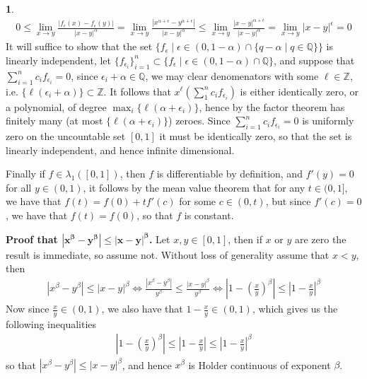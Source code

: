 \documentclass[10.5pt]{article}
\theoremstyle{definition}
\newtheorem{pb}{}
\newcommand{\set}[1]{\{#1\}}
\newcommand{\abs}[1]{\left\vert#1\right\vert}
\newcommand{\tor}{\text{ or }}
\begin{document}
\begin{pb}
            \begin{align*}
                0 \leq \lim_{x \to y}\frac{\abs{f_\epsilon(x) - f_\epsilon(y)}}{\abs{x-y}^\alpha} = \lim_{x \to y}\frac{\abs{x^{\alpha + \epsilon} - y^{\alpha + \epsilon}}}{\abs{x-y}^\alpha} \leq \lim_{x \to y}\frac{\abs{x - y}^{\alpha + \epsilon}}{\abs{x-y}^\alpha} = \lim_{x \to y}\abs{x-y}^\epsilon = 0
            \end{align*}
            It will suffice to show that the set \(\set{f_\epsilon \mid \epsilon \in (0,1-\alpha) \cap \set{q - \alpha \mid q \in \mathbb{Q}}}\) is linearly independent, let \(\set{f_{\epsilon_i}}_{i=1}^n \subset \set{f_\epsilon \mid \epsilon \in (0,1-\alpha) \cap \mathbb{Q}}\), and suppose that \(\sum_{i=1}^n c_i f_{\epsilon_i} = 0\), since \(\epsilon_i + \alpha \in \mathbb{Q}\), we may clear denomenators with some \(\ell \in \mathbb{Z}\), i.e. \(\set{\ell(\epsilon_i + \alpha)} \subset \mathbb{Z}\). It follows that \(x^\ell(\sum_1^n c_i f_{\epsilon_i})\) is either identically zero, or a polynomial, of degree \(\max_i\set{\ell (\alpha + \epsilon_i)}\), hence by the factor theorem has finitely many (at most \(\set{\ell (\alpha + \epsilon_i)}\)) zeroes. Since \(\sum_{i=1}^n c_i f_{\epsilon_i} = 0\) is uniformly zero on the uncountable set \([0,1]\) it must be identically zero, so that the set is linearly independent, and hence infinite dimensional.

            Finally if \(f \in \lambda_1([0,1])\), then \(f\) is differentiable by definition, and \(f'(y) = 0\) for all \(y \in (0,1)\), it follows by the mean value theorem that for any \(t \in (0,1]\), we have that \(f(t) = f(0) + tf'(c)\) for some \(c \in (0,t)\), but since \(f'(c) = 0\), we have that \(f(t) = f(0)\), so that \(f\) is constant.

            \textbf{Proof that \(\mathbf{\abs{x^\beta - y^\beta} \leq \abs{x-y}^\beta}\).} Let \(x,y \in [0,1]\), then if \(x \tor y\) are zero the result is immediate, so assume not. Without loss of generality assume that \(x < y\), then
            \begin{align*}
                \abs{x^\beta - y^\beta} \leq \abs{x - y}^\beta \iff \frac{\abs{x^\beta - y^\beta}}{y^\beta} \leq \frac{\abs{x - y}^\beta}{y^\beta} \iff \abs{1 - \left(\frac{x}{y}\right)^\beta} \leq \abs{1 - \frac{x}{y}}^\beta
            \end{align*}
            Now since \(\frac{x}{y} \in (0,1)\), we also have that \(1 - \frac{x}{y} \in (0,1)\), which gives us the following inequalities
            \begin{align*}
                \abs{1 - \left(\frac{x}{y}\right)^\beta} \leq \abs{1 - \frac{x}{y}} \leq \abs{1 - \frac{x}{y}}^\beta
            \end{align*}
            so that \(\abs{x^\beta - y^\beta} \leq \abs{x - y}^\beta\), and hence \(x^\beta\) is Holder continuous of exponent \(\beta\).
        \end{pb}
\end{document}

